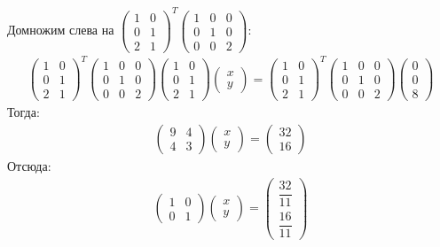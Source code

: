 \documentclass[11pt,a4paper]{report}
\begin{document}
Домножим слева на $\begin{pmatrix} 1&0\\0&1\\2&1 \end{pmatrix}^T\begin{pmatrix} 1&0&0\\0&1&0\\0&0&2 \end{pmatrix}$:
\begin{gather*}
\begin{pmatrix} 1&0\\0&1\\2&1 \end{pmatrix}^T\begin{pmatrix} 1&0&0\\0&1&0\\0&0&2 \end{pmatrix}\begin{pmatrix} 1&0\\0&1\\2&1 \end{pmatrix}\begin{pmatrix} x\\y \end{pmatrix}=\begin{pmatrix} 1&0\\0&1\\2&1 \end{pmatrix}^T\begin{pmatrix} 1&0&0\\0&1&0\\0&0&2 \end{pmatrix}\begin{pmatrix} 0\\0\\8 \end{pmatrix}
\end{gather*}
Тогда:  
\begin{gather*}
\begin{pmatrix} 9&4\\4&3 \end{pmatrix}\begin{pmatrix} x\\y \end{pmatrix}=\begin{pmatrix} 32\\16 \end{pmatrix}
\end{gather*}
Отсюда:
\begin{gather*}
\begin{pmatrix} 1&0\\0&1 \end{pmatrix}\begin{pmatrix} x\\y \end{pmatrix}=\begin{pmatrix} \dfrac{32}{11}\\[2ex]\dfrac{16}{11} \end{pmatrix}
\end{gather*}
\end{document}
